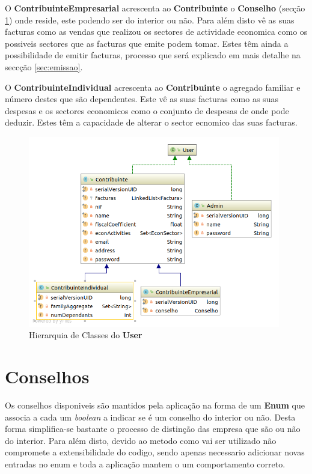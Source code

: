 \documentclass[12pt,a4paper]{report}
\begin{document}
    O \textbf{ContribuinteEmpresarial} acrescenta ao \textbf{Contribuinte}
    o \textbf{Conselho} (secção \ref{sec:conselho}) onde reside, este podendo
    ser do interior ou não. Para além disto vê as suas facturas como as vendas
    que realizou os sectores de actividade economica como os possiveis sectores
    que as facturas que emite podem tomar. Estes têm ainda a possibilidade de
    emitir facturas, processo que será explicado em mais detalhe na seccção
     \ref{sec:emissao}.

    O \textbf{ContribuinteIndividual} acrescenta ao \textbf{Contribuinte}
    o agregado familiar e número destes que são dependentes. Este vê as suas
    facturas como as suas despesas e os sectores economicos como o conjunto
    de despesas de onde pode deduzir. Estes têm a capacidade de alterar o
    sector ecnomico das suas facturas.
    \begin{figure}[H]
        \centering
        \includegraphics[width=11cm]{./images/UserHierarquy.png}
        \caption{Hierarquia de Classes do \textbf{User}}\label{fig:Hierarquia}
    \end{figure}

\section{Conselhos}
\label{sec:conselho}
    Os conselhos disponiveis são mantidos pela aplicação na forma de um
    \textbf{Enum} que associa a cada um \textit{boolean} a indicar se é um
    conselho do interior ou não. Desta forma simplifica-se bastante o processo
    de distinção das empresa que são ou não do interior. Para além disto, devido
    ao metodo como vai ser utilizado não compromete a extensibilidade do codigo,
    sendo apenas necessario adicionar novas entradas no enum e toda a aplicação
    mantem o um comportamento correto.
\end{document}

